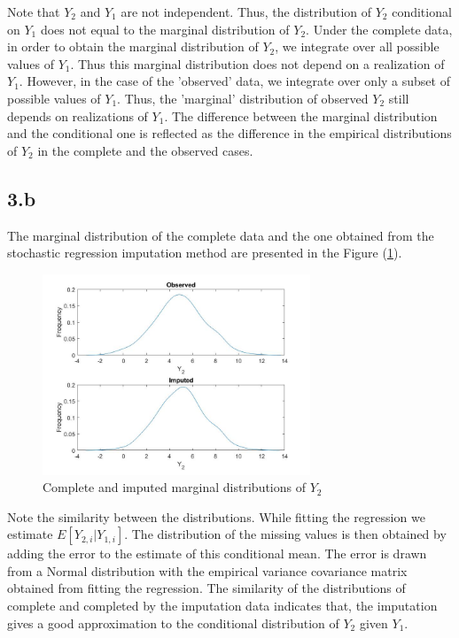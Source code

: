 \documentclass{article}
\begin{document}
Note that $Y_{2}$ and $Y_{1}$ are not independent. Thus, the distribution of $Y_{2}$ conditional on $Y_{1}$ does not equal to the marginal distribution of $Y_{2}$. Under the complete data, in order to obtain the marginal distribution of $Y_{2}$, we integrate over all possible values of $Y_{1}$. Thus this marginal distribution does not depend on a realization of $Y_{1}$. However, in the case of the 'observed' data, we integrate over only a subset of possible values of $Y_{1}$. Thus, the 'marginal' distribution of observed $Y_{2}$ still depends on realizations of $Y_{1}$.  The difference between the marginal distribution and the conditional one is reflected as the difference in the empirical distributions of $Y_{2}$ in the complete and the observed cases. 

\subsection*{3.b}

The marginal distribution of the complete data and the one obtained from the stochastic regression imputation method are presented in the Figure  (\ref{Fig_2}).

\begin{figure}[H]
\centering
\caption{Complete and imputed marginal distributions of $Y_{2}$}
\label{Fig_2}
\includegraphics[width=8cm]{q3b.jpg}
\end{figure} 

Note the similarity between the distributions. While fitting the regression we estimate $E\left[Y_{2,i}|Y_{1,i}\right]$. The distribution of the missing values is then obtained by adding the error to the estimate of this conditional mean. The error is drawn from a Normal distribution with the empirical variance covariance matrix obtained from fitting the regression. The similarity of the distributions of complete and completed by the imputation data indicates that, the imputation gives a good approximation to the conditional distribution of $Y_{2}$ given $Y_{1}$. 
\end{document}
